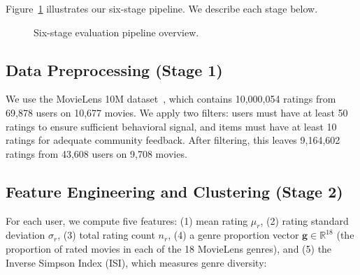 \documentclass[sigconf,nonacm]{acmart}
\begin{document}
Figure~\ref{fig:pipeline} illustrates our six-stage pipeline. We describe each stage below.

\begin{figure}[t]
\centering
{}
\caption{Six-stage evaluation pipeline overview.}
\label{fig:pipeline}
\end{figure}

\subsection{Data Preprocessing (Stage 1)}

We use the MovieLens 10M dataset~\cite{harper2015movielens}, which contains 10,000,054 ratings from 69,878 users on 10,677 movies. We apply two filters: users must have at least 50 ratings to ensure sufficient behavioral signal, and items must have at least 10 ratings for adequate community feedback. After filtering, this leaves 9,164,602 ratings from 43,608 users on 9,708 movies.

\subsection{Feature Engineering and Clustering (Stage 2)}

For each user, we compute five features: (1) mean rating $\mu_r$, (2) rating standard deviation $\sigma_r$, (3) total rating count $n_r$, (4) a genre proportion vector $\mathbf{g} \in \mathbb{R}^{18}$ (the proportion of rated movies in each of the 18 MovieLens genres), and (5) the Inverse Simpson Index (ISI), which measures genre diversity:
\end{document}
